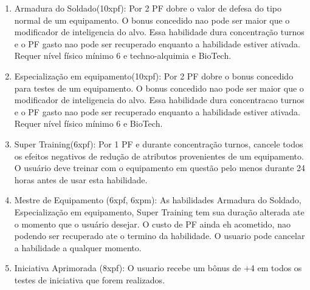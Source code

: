 \begin{enumerate}
	\item Armadura do Soldado(10xpf): Por 2 PF dobre o valor de defesa do tipo normal de um equipamento. O bonus concedido nao pode ser maior que o modificador de inteligencia do alvo. Essa habilidade dura concentração turnos e o PF gasto nao pode ser recuperado enquanto a habilidade estiver ativada. Requer nível físico mínimo 6 e techno-alquimia e BioTech. 

	\item Especialização em equipamento(10xpf): Por 2 PF dobre o bonus concedido para testes de um equipamento. O bonus concedido nao pode ser maior que o modificador de inteligencia do alvo. Essa habilidade dura concentracao turnos e o PF gasto nao pode ser recuperado enquanto a habilidade estiver ativada. Requer nível físico mínimo 6 e BioTech. 

	\item Super Training(6xpf): Por 1 PF e durante concentração turnos, cancele todos os efeitos negativos de redução de atributos provenientes de um equipamento. O usuário deve treinar com o equipamento em questão pelo menos durante 24 horas antes de usar esta habilidade. 

    \item Mestre de Equipamento (6xpf, 6xpm): As habilidades Armadura do Soldado, Especialização em equipamento, Super Training tem sua duração alterada ate o momento que o usuário desejar. O custo de PF ainda eh acometido, nao podendo ser recuperado ate o termino da habilidade. O usuario pode cancelar a habilidade a qualquer momento.




	\item Iniciativa Aprimorada (8xpf): O usuario recebe um bônus de +4 em todos os testes de iniciativa que forem realizados.


\end{enumerate}
